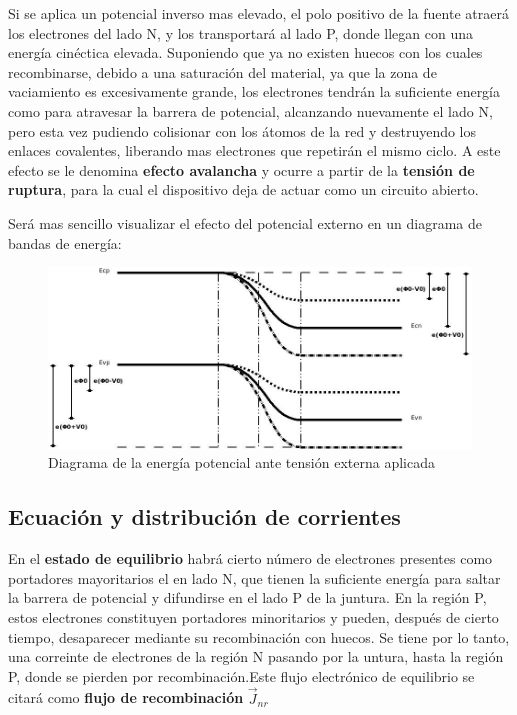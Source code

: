 \documentclass[oneside]{book}
\numberwithin{equation}{section}
\numberwithin{figure}{section}
\numberwithin{table}{section}
\begin{document}
			Si se aplica un potencial inverso mas elevado, el polo positivo de la fuente atraerá los electrones del lado N, y los transportará al lado P, donde llegan con una energía cinéctica elevada. Suponiendo que ya no existen huecos con los cuales recombinarse, debido a una saturación del material, ya que la zona de vaciamiento es excesivamente grande, los electrones tendrán la suficiente energía como para atravesar la barrera de potencial, alcanzando nuevamente el lado N, pero esta vez pudiendo colisionar con los átomos de la red y destruyendo los enlaces covalentes, liberando mas electrones que repetirán el mismo ciclo. A este efecto se le denomina \textbf{efecto avalancha} y ocurre a partir de la \textbf{tensión de ruptura}, para la cual el dispositivo deja de actuar como un circuito abierto.			
			
			
			Será mas sencillo visualizar el efecto del potencial externo en un diagrama de bandas de energía:\\
			
			\begin{figure}[H]
					\begin{center}
						\includegraphics[scale=0.5]{Fermi-PN-dir-inv.jpeg}
						\caption{Diagrama de la energía potencial ante tensión externa aplicada}
					\end{center}
				\end{figure}		
			
			\subsection{Ecuación y distribución de corrientes}
		
				En el \textbf{estado de equilibrio} habrá cierto número de electrones presentes como portadores mayoritarios el en lado N, que tienen la suficiente energía para saltar la barrera de potencial y difundirse en el lado P de la juntura. En la región P, estos electrones constituyen portadores minoritarios y pueden, después de cierto tiempo, desaparecer mediante su recombinación con huecos. Se tiene por lo tanto, una correinte de electrones de la región N pasando por la untura, hasta la región P, donde se pierden por recombinación.Este flujo electrónico de equilibrio se citará como \textbf{flujo de recombinación} $\vec{J}_{nr}$\\
				
\end{document}
